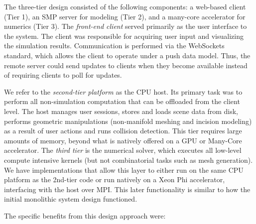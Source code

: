  The three-tier design consisted of the following components: a
 web-based client (Tier 1), an SMP server for modeling (Tier 2), and a
 many-core accelerator for numerics (Tier 3).  The \emph{front-end
   client} served primarily as the user interface to the system. The
 client was responsible for acquiring user input and visualizing the
 simulation results. Communication is performed via the WebSockets
 standard, which allows the client to operate under a push data
 model. Thus, the remote server could send updates to clients when
 they become available instead of requiring clients to poll for
 updates.
 
 We refer to the \emph{second-tier platform} as the CPU host. Its
 primary task was to perform all non-simulation computation that can
 be offloaded from the client level. The host manages user sessions,
 stores and loads scene data from disk, performs geometric
 manipulations (non-manifold meshing and incision modeling) as a
 result of user actions and runs collision detection. This tier
 requires large amounts of memory, beyond what is natively offered on
 a GPU or Many-Core accelerator. The \emph{third tier} is the
 numerical solver, which executes all low-level compute intensive
 kernels (but not combinatorial tasks such as mesh generation). We
 have implementations that allow this layer to either run on the same
 CPU platform as the 2nd-tier code or run natively on a Xeon Phi
 accelerator, interfacing with the host over MPI. This later
 functionality is similar to how the initial monolithic system design
 functioned.

 The specific benefits from this design approach were:

